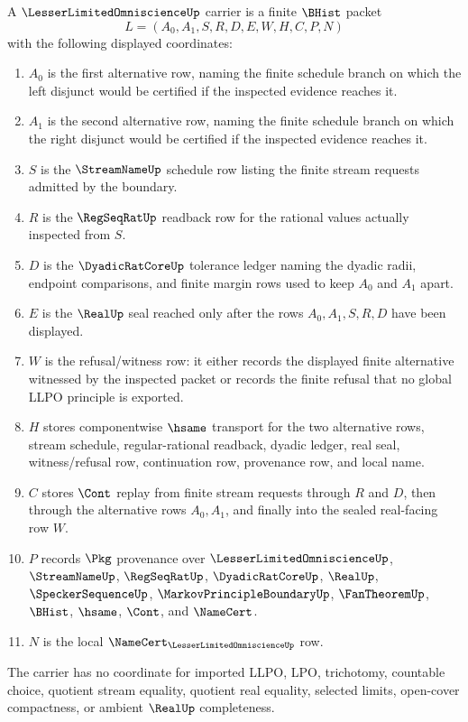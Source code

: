 \begin{definition}
\label{def:lesser-limited-omniscience-carrier}
A $\LesserLimitedOmniscienceUp$ carrier is a finite $\BHist$ packet
$$
L=(A_0,A_1,S,R,D,E,W,H,C,P,N)
$$
with the following displayed coordinates:
\begin{enumerate}
\item $A_0$ is the first alternative row, naming the finite schedule branch on which the left disjunct would be certified if the inspected evidence reaches it.
\item $A_1$ is the second alternative row, naming the finite schedule branch on which the right disjunct would be certified if the inspected evidence reaches it.
\item $S$ is the $\StreamNameUp$ schedule row listing the finite stream requests admitted by the boundary.
\item $R$ is the $\RegSeqRatUp$ readback row for the rational values actually inspected from $S$.
\item $D$ is the $\DyadicRatCoreUp$ tolerance ledger naming the dyadic radii, endpoint comparisons, and finite margin rows used to keep $A_0$ and $A_1$ apart.
\item $E$ is the $\RealUp$ seal reached only after the rows $A_0,A_1,S,R,D$ have been displayed.
\item $W$ is the refusal/witness row: it either records the displayed finite alternative witnessed by the inspected packet or records the finite refusal that no global LLPO principle is exported.
\item $H$ stores componentwise $\hsame$ transport for the two alternative rows, stream schedule, regular-rational readback, dyadic ledger, real seal, witness/refusal row, continuation row, provenance row, and local name.
\item $C$ stores $\Cont$ replay from finite stream requests through $R$ and $D$, then through the alternative rows $A_0,A_1$, and finally into the sealed real-facing row $W$.
\item $P$ records $\Pkg$ provenance over $\LesserLimitedOmniscienceUp$, $\StreamNameUp$, $\RegSeqRatUp$, $\DyadicRatCoreUp$, $\RealUp$, $\SpeckerSequenceUp$, $\MarkovPrincipleBoundaryUp$, $\FanTheoremUp$, $\BHist$, $\hsame$, $\Cont$, and $\NameCert$.
\item $N$ is the local $\NameCert_{\LesserLimitedOmniscienceUp}$ row.
\end{enumerate}
The carrier has no coordinate for imported LLPO, LPO, trichotomy, countable choice, quotient stream equality, quotient real equality, selected limits, open-cover compactness, or ambient $\RealUp$ completeness.
\end{definition}

